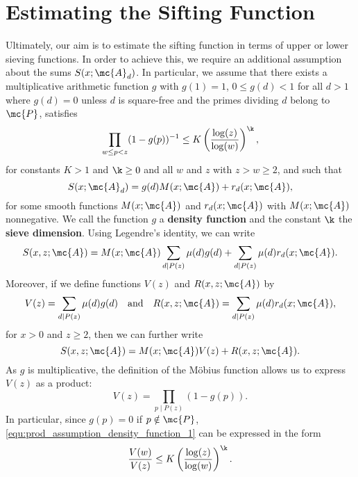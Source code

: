   \section{Estimating the Sifting Function}
    Ultimately, our aim is to estimate the sifting function in terms of upper or lower sieving functions. In order to achieve this, we require an additional assumption about the sums $S(x;\mc{A}_{d})$. In particular, we assume that there exists a multiplicative arithmetic function $g$ with $g(1) = 1$, $0 \le g(d) < 1$ for all $d > 1$ where $g(d) = 0$ unless $d$ is square-free and the primes dividing $d$ belong to $\mc{P}$, satisfies
    \begin{equation}\label{equ:prod_assumption_density_function_1}
      \prod_{w \le p < z}(1-g(p))^{-1} \le K\left(\frac{\log(z)}{\log(w)}\right)^{\k},
    \end{equation}
    for constants $K > 1$ and $\k \ge 0$ and all $w$ and $z$ with $z > w \ge 2$, and such that  
    \begin{equation}\label{equ:d_multiple_sifting_function_estimate}
      S(x;\mc{A}_{d}) = g(d)M(x;\mc{A})+r_{d}(x;\mc{A}),
    \end{equation}
    for some smooth functions $M(x;\mc{A})$ and $r_{d}(x;\mc{A})$ with $M(x;\mc{A})$ nonnegative. We call the function $g$ a \textbf{density function} and the constant $\k$ the \textbf{sieve dimension}. Using Legendre's identity, we can write
    \[
      S(x,z;\mc{A}) = M(x;\mc{A})\sum_{d \mid P(z)}\mu(d)g(d)+\sum_{d \mid P(z)}\mu(d)r_{d}(x;\mc{A}).
    \]
    Moreover, if we define functions $V(z)$ and $R(x,z;\mc{A})$ by
    \[
      V(z) = \sum_{d \mid P(z)}\mu(d)g(d) \quad \text{and} \quad R(x,z;\mc{A}) = \sum_{d \mid P(z)}\mu(d)r_{d}(x;\mc{A}),
    \]
    for $x > 0$ and $z \ge 2$, then we can further write
    \[
      S(x,z;\mc{A}) = M(x;\mc{A})V(z)+R(x,z;\mc{A}).
    \]
    As $g$ is multiplicative, the definition of the M\"obius function allows us to express $V(z)$ as a product:
    \begin{equation}\label{equ:V_product_formula}
      V(z) = \prod_{p \mid P(z)}(1-g(p)).
    \end{equation}
    In particular, since $g(p) = 0$ if $p \notin \mc{P}$, \cref{equ:prod_assumption_density_function_1} can be expressed in the form
    \begin{equation}\label{equ:prod_assumption_density_function_2}
      \frac{V(w)}{V(z)} \le K\left(\frac{\log(z)}{\log(w)}\right)^{\k}.
    \end{equation}
